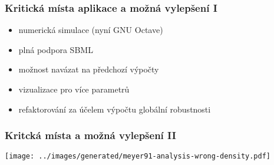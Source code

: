 \documentclass[xcolor=svgnames]{beamer}
\begin{document}
\begin{frame}
	\frametitle{Kritická místa aplikace a možná vylepšení I}
	
	\begin{itemize}
		\item	numerická simulace (nyní GNU Octave)
		\item	plná podpora SBML
		\item	možnost navázat na předchozí výpočty
		\item	vizualizace pro více parametrů
		\item	refaktorování za účelem výpočtu globální robustnosti
	\end{itemize}
\end{frame}
\begin{frame}
	\frametitle{Kritcká místa a možná vylepšení II}
	\begin{center}
		\texttt{[image: ../images/generated/meyer91-analysis-wrong-density.pdf]}
	\end{center}
\end{frame}
\end{document}
